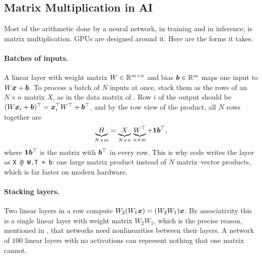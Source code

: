 \subsection{Matrix Multiplication in AI}
\label{sec:ch03-matmul-ai}

Most of the arithmetic done by a neural network, in training and in
inference, is matrix multiplication. GPUs are designed around it. Here
are the forms it takes.

\paragraph{Batches of inputs.}
A linear layer with weight matrix $W \in \mathbb{R}^{m \times n}$ and bias
$\bm{b} \in \mathbb{R}^m$ maps one input to $W\bm{x} + \bm{b}$. To process a
batch of $N$ inputs at once, stack them as the rows of an $N \times n$
matrix $X$, as in the data matrix of . Row $i$
of the output should be $(W\bm{x}_i + \bm{b})^\top =
\bm{x}_i^\top W^\top + \bm{b}^\top$, and by the row view of the
product, all $N$ rows together are
\[
  \underbrace{H}_{N \times m}
  = \underbrace{X}_{N \times n} \, \underbrace{W^\top}_{n \times m}
    + \mathbf{1} \bm{b}^\top ,
\]
where $\mathbf{1} \bm{b}^\top$ is the matrix with $\bm{b}^\top$ in every
row. This is why code writes the layer as \texttt{X @ W.T + b}: one large
matrix product instead of $N$ matrix--vector products, which is far
faster on modern hardware.

\paragraph{Stacking layers.}
Two linear layers in a row compute $W_2(W_1 \bm{x}) = (W_2 W_1)\bm{x}$.
By associativity this is a single linear layer with weight matrix
$W_2 W_1$, which is the precise reason, mentioned in
, that networks need nonlinearities between
their layers. A network of $100$ linear layers with no activations can
represent nothing that one matrix cannot.


